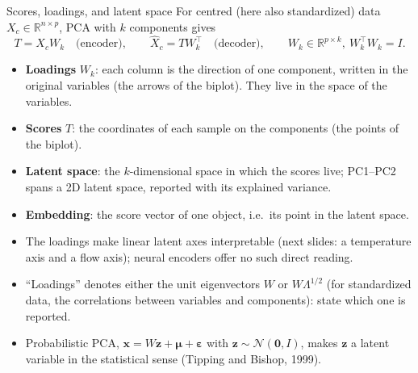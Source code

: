 \begin{frame}{Scores, loadings, and latent space}
\begingroup\small
For centred (here also standardized) data $X_c \in \mathbb{R}^{n \times p}$, PCA with $k$ components gives
\[
T = X_c W_k \quad \text{(encoder)}, \qquad \hat{X}_c = T W_k^{\top} \quad \text{(decoder)}, \qquad W_k \in \mathbb{R}^{p \times k},\ W_k^{\top} W_k = I.
\]
\vspace{-0.6em}
\begin{itemize}\setlength{\itemsep}{2pt}
\item \textbf{Loadings} $W_k$: each column is the direction of one component, written in the original variables (the arrows of the biplot). They live in the space of the variables.
\item \textbf{Scores} $T$: the coordinates of each sample on the components (the points of the biplot).
\item \textbf{Latent space}: the $k$-dimensional space in which the scores live; PC1--PC2 spans a 2D latent space, reported with its explained variance.
\item \textbf{Embedding}: the score vector of one object, i.e.\ its point in the latent space.
\end{itemize}
\par\endgroup
\vspace{0.2em}
\begingroup\scriptsize
\begin{itemize}\setlength{\itemsep}{1pt}
\item The loadings make linear latent axes interpretable (next slides: a temperature axis and a flow axis); neural encoders offer no such direct reading.
\item ``Loadings'' denotes either the unit eigenvectors $W$ or $W\Lambda^{1/2}$ (for standardized data, the correlations between variables and components): state which one is reported.
\item Probabilistic PCA, $\mathbf{x} = W\mathbf{z} + \boldsymbol{\mu} + \boldsymbol{\varepsilon}$ with $\mathbf{z} \sim \mathcal{N}(\mathbf{0}, I)$, makes $\mathbf{z}$ a latent variable in the statistical sense (Tipping and Bishop, 1999).
\end{itemize}
\par\endgroup
\coursefooter
\end{frame}

